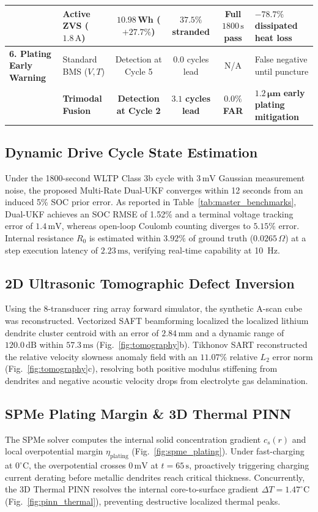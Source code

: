 \documentclass[journal]{IEEEtran}
\begin{document}
\begin{table}[t]
\begin{tabular}{@{}llcccl@{}}
& \textbf{Active ZVS ($1.8\,\text{A}$)} & $\mathbf{10.98\,\text{Wh}}$ ($\mathbf{+27.7\%}$) & $\mathbf{37.5\%}$ stranded & \textbf{Full $1800\,\text{s}$ pass} & $\mathbf{-78.7\%}$ \textbf{dissipated heat loss} \\
\midrule
\textbf{6. Plating Early Warning} & Standard BMS ($V, T$) & Detection at Cycle 5 & $0.0$ cycles lead & N/A & False negative until puncture \\
& \textbf{Trimodal Fusion} & \textbf{Detection at Cycle 2} & $\mathbf{3.1}$ \textbf{cycles lead} & $\mathbf{0.0\%}$ \textbf{FAR} & $\mathbf{1.2\,\mu\text{m}}$ \textbf{early plating mitigation} \\
\bottomrule
\end{tabular}
\end{table}

\subsection{Dynamic Drive Cycle State Estimation}
Under the 1800-second WLTP Class 3b cycle with $3\,\text{mV}$ Gaussian measurement noise, the proposed Multi-Rate Dual-UKF converges within 12 seconds from an induced 5\% SOC prior error. As reported in Table~\ref{tab:master_benchmarks}, Dual-UKF achieves an SOC RMSE of 1.52\% and a terminal voltage tracking error of $1.4\,\text{mV}$, whereas open-loop Coulomb counting diverges to $5.15\%$ error. Internal resistance $R_0$ is estimated within $3.92\%$ of ground truth ($0.0265\,\Omega$) at a step execution latency of $2.23\,\text{ms}$, verifying real-time capability at 10~Hz.

\subsection{2D Ultrasonic Tomographic Defect Inversion}
Using the 8-transducer ring array forward simulator, the synthetic A-scan cube was reconstructed. Vectorized SAFT beamforming localized the localized lithium dendrite cluster centroid with an error of $2.84\,\text{mm}$ and a dynamic range of $120.0\,\text{dB}$ within $57.3\,\text{ms}$ (Fig.~\ref{fig:tomography}b). Tikhonov SART reconstructed the relative velocity slowness anomaly field with an $11.07\%$ relative $L_2$ error norm (Fig.~\ref{fig:tomography}c), resolving both positive modulus stiffening from dendrites and negative acoustic velocity drops from electrolyte gas delamination.

\subsection{SPMe Plating Margin & 3D Thermal PINN}
The SPMe solver computes the internal solid concentration gradient $c_s(r)$ and local overpotential margin $\eta_{\text{plating}}$ (Fig.~\ref{fig:spme_plating}). Under fast-charging at $0^\circ\text{C}$, the overpotential crosses $0\,\text{mV}$ at $t = 65\,\text{s}$, proactively triggering charging current derating before metallic dendrites reach critical thickness. Concurrently, the 3D Thermal PINN resolves the internal core-to-surface gradient $\Delta T = 1.47^\circ\text{C}$ (Fig.~\ref{fig:pinn_thermal}), preventing destructive localized thermal peaks.
\end{document}
